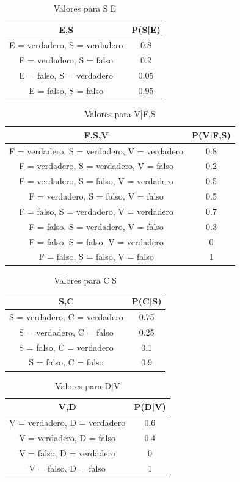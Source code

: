 \documentclass[letterpaper,12pt]{article}
\theoremstyle{definition}
\begin{document}
\begin{table}[H]
	\centering
	\begin{tabular}{|c|c|}
		\toprule
		E,S & P(S|E) \\
		\midrule
		E = verdadero, S = verdadero & 0.8 \\
		E = verdadero, S = falso & 0.2 \\
		E = falso, S = verdadero & 0.05  \\
		E = falso, S = falso & 0.95  \\
		\bottomrule
	\end{tabular}
	\caption{Valores para S|E}
\end{table}


\begin{table}[H]
	\centering
	\begin{tabular}{|c|c|}
		\toprule
		F,S,V & P(V|F,S) \\
		\midrule
		F = verdadero, S = verdadero, V = verdadero & 0.8 \\
		F = verdadero, S = verdadero, V = falso     & 0.2  \\
		F = verdadero, S = falso, V = verdadero     & 0.5 \\
		F = verdadero, S = falso, V = falso        & 0.5  \\
		F = falso, S = verdadero, V = verdadero & 0.7 \\
		F = falso, S = verdadero, V = falso     & 0.3  \\
		F = falso, S = falso, V = verdadero     & 0 \\
		F = falso, S = falso, V = falso        & 1  \\
		\bottomrule
	\end{tabular}
	\caption{Valores para V|F,S}
\end{table}

\begin{table}[H]
	\centering
	\begin{tabular}{|c|c|}
		\toprule
		S,C & P(C|S) \\
		\midrule
		S = verdadero, C = verdadero & 0.75 \\
		S = verdadero, C = falso & 0.25 \\
		S = falso, C = verdadero & 0.1  \\
		S = falso, C = falso & 0.9  \\
		\bottomrule
	\end{tabular}
	\caption{Valores para C|S}
\end{table}

\begin{table}[H]
	\centering
	\begin{tabular}{|c|c|}
		\toprule
		V,D & P(D|V) \\
		\midrule
		V = verdadero, D = verdadero & 0.6 \\
		V = verdadero, D = falso & 0.4 \\
		V = falso, D = verdadero & 0  \\
		V = falso, D = falso & 1  \\
		\bottomrule
	\end{tabular}
	\caption{Valores para D|V}
\end{table}
\end{document}
